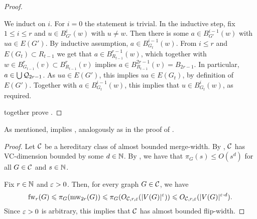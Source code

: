 \begin{proof}
    \begin{claimproof}
        We induct on $i$. For $i=0$ the statement is trivial.
    In the inductive step, fix $1\le i\le r$ and $u\in B^i_{G'}(w)$ with $u\neq w$.
    Then there is some  $a\in B^{i-1}_{G'}(w)$ with $ua\in E(G')$.
    By inductive assumption, $a\in B^{i-1}_{G_t}(w)$.
    From  $i\le r$ and  $E(G_t)\subset R_{t-1}$
    we get that $a\in B^{r-1}_{R_{t-1}}(w)$,
    which together with $w\in B^{r}_{G_{t-1}}(v)\subset B^{r}_{R_{t-1}}(v)$ implies $a\in B^{2r-1}_{R_{t-1}}(v)=B_{2r-1}$. In particular, $a\in \bigcup \cal Q_{2r-1}$.
    As $ua\in E(G')$, this implies $ua\in E(G_t)$, by definition of $E(G')$. Together with 
    $a\in B^{i-1}_{G_t}(w)$, this implies that $u\in B^{i}_{G_t}(w)$, as required.
    \end{claimproof}
     together prove .
    \end{proof}
   As mentioned,  implies ,
   analogously as in the proof of .


\thmabmw*
\begin{proof}
    Let $\CC$ be a hereditary class of almost bounded merge-width.
    By , $\CC$  has VC-dimension bounded by some $d\in\N$.
By , we have that $\pi_G(s)\le O(s^d)$ for all $G\in\CC$ and $s\in\N$.

Fix $r\in\N$ and $\eps>0$.
Then, for every graph $G\in\CC$, we have 
$$\fw_r(G)\le \pi_G(\mw_{2r}(G))\le \pi_G(O_{\CC,r,\eps}(|V(G)|^\eps))\le O_{\CC,r,\eps}(|V(G)|^{\eps\cdot d}).$$
Since $\eps>0$ is arbitrary, this implies that $\CC$ has almost bounded flip-width.
\end{proof}

























    



